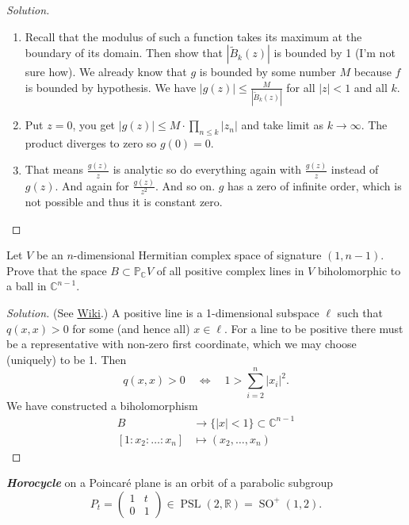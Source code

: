 \begin{proof}[Solution]
\begin{enumerate}[label=\textbf{Step \arabic*}]
		\item Recall that the modulus of such a function takes its maximum at the boundary of its domain. Then show that $|\tilde{B}_{k}(z)|$ is bounded by 1 (I'm not sure how). We already know that $g$ is bounded by some number $M$ because $f$ is bounded by hypothesis. We have $|g(z)| \leq \frac{M}{|\tilde{B}_{k}(z)|}$ for all $|z|<1$ and all $k$.

		\item Put $z=0$, you get $|g(z)| \leq M\cdot \prod_{n\leq k} |z_{n}| $ and take limit as $k\to \infty$. The product diverges to zero so $g(0)=0$.

		\item That means $\frac{g(z)}{z}$ is analytic so do everything again with $\frac{g(z)}{z}$ instead of $g(z)$. And again for $\frac{g(z)}{z^{2}}$. And so on. $g$ has a zero of infinite order, which is not possible and thus it is constant zero.
	\end{enumerate}
\end{proof}

\begin{manualexercise}{3.3}
	Let $V$ be an $n$-dimensional Hermitian complex space of signature $(1,n-1)$. Prove that the space $B\subset \mathbb{P}_{\mathbb{C}}V$ of all positive complex lines in $V$ biholomorphic to a ball in $\mathbb{C}^{n-1}$.
\end{manualexercise}

\begin{proof}[Solution]
	(See \href{https://en.wikipedia.org/wiki/Complex_hyperbolic_space#Projective_model}{Wiki}.) A positive line is a 1-dimensional subspace $\ell$ such that $q(x,x)>0$ for some (and hence all) $x\in \ell$. For a line to be positive there must be a representative with non-zero first coordinate, which we may choose (uniquely) to be 1. Then
	\[q(x,x) >0\quad \iff\quad 1>\sum_{i=2}^{n} |x_i|^2.\]
We have constructed a biholomorphism
\begin{align*}
	B &\longrightarrow \{ |x|<1\} \subset \mathbb{C}^{n-1} \\
	[1:x_2:\ldots:x_n] &\longmapsto (x_2,\ldots,x_n)
\end{align*}

\end{proof}

\begin{manualdef}{3.1}
	\textit{\textbf{Horocycle}} on a Poincar\'e plane is an orbit of a parabolic subgroup
	\[P_{t}=\begin{pmatrix}1&t\\0&1\end{pmatrix}\in \operatorname{PSL}(2,\mathbb{R})=\operatorname{SO}^{+}(1,2). \]
\end{manualdef}

